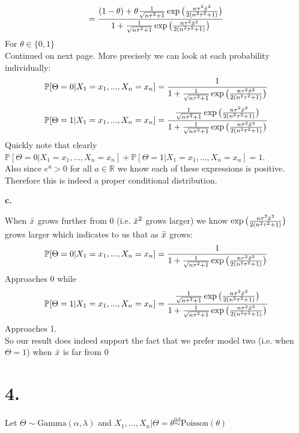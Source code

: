 \documentclass{article}
\begin{document}
\begin{center}
    \[=\frac{(1 -\theta) +\theta\frac{1}{\sqrt{n\tau^2 + 1}}\exp{\big{(}\frac{n\tau^2\Bar{x}^2}{2(n^2\tau^2 + 1)}\big{)}}}{1 +\frac{1}{\sqrt{n\tau^2 + 1}}\exp{\big{(}\frac{n\tau^2\Bar{x}^2}{2(n^2\tau^2 + 1)}\big{)}}}\]
    For $\theta\in\{0, 1\}$
    \vspace{0.2in}
    \\Continued on next page.
    \newpage
    More precisely we can look at each probability individually:
    \[\mathbb{P}[\Theta = 0 | X_1 = x_1, ..., X_n = x_n] =\frac{1}{1 +\frac{1}{\sqrt{n\tau^2 + 1}}\exp{\big{(}\frac{n\tau^2\Bar{x}^2}{2(n^2\tau^2 + 1)}\big{)}}}\]
    \[\mathbb{P}[\Theta = 1 | X_1 = x_1, ..., X_n = x_n] =\frac{\frac{1}{\sqrt{n\tau^2 + 1}}\exp{\big{(}\frac{n\tau^2\Bar{x}^2}{2(n^2\tau^2 + 1)}\big{)}}}{1 +\frac{1}{\sqrt{n\tau^2 + 1}}\exp{\big{(}\frac{n\tau^2\Bar{x}^2}{2(n^2\tau^2 + 1)}\big{)}}}\]
    Quickly note that clearly $\mathbb{P}[\Theta = 0 | X_1 = x_1, ..., X_n = x_n] +\mathbb{P}[\Theta = 1 | X_1 = x_1, ..., X_n = x_n] = 1$.
    \\Also since $e^{a} > 0$ for all $a\in\mathbb{R}$ we know each of these expressions is positive.
    \\Therefore this is indeed a proper conditional distribution.
\end{center}

{\Large\textbf{c.}}
\begin{center}
\doublespacing
    When $\Bar{x}$ grows further from 0 (i.e. $\Bar{x}^2$ grows larger) we know $\exp{\big{(}\frac{n\tau^2\Bar{x}^2}{2(n^2\tau^2 + 1)}\big{)}}$ grows larger which indicates to us that as $\Bar{x}$ grows:
    \[\mathbb{P}[\Theta = 0 | X_1 = x_1, ..., X_n = x_n] =\frac{1}{1 +\frac{1}{\sqrt{n\tau^2 + 1}}\exp{\big{(}\frac{n\tau^2\Bar{x}^2}{2(n^2\tau^2 + 1)}\big{)}}}\]
    Approaches 0 while
    \[\mathbb{P}[\Theta = 1 | X_1 = x_1, ..., X_n = x_n] =\frac{\frac{1}{\sqrt{n\tau^2 + 1}}\exp{\big{(}\frac{n\tau^2\Bar{x}^2}{2(n^2\tau^2 + 1)}\big{)}}}{1 +\frac{1}{\sqrt{n\tau^2 + 1}}\exp{\big{(}\frac{n\tau^2\Bar{x}^2}{2(n^2\tau^2 + 1)}\big{)}}}\]
    Approaches 1.
    \\So our result does indeed support the fact that we prefer model two (i.e. when $\Theta = 1$) when $\Bar{x}$ is far from 0 \qedsymbol
\end{center}


\newpage
\section*{4.}
\begin{center}
\doublespacing
    Let $\Theta\sim\mbox{Gamma}(\alpha,\lambda)$ and $X_1, ..., X_n |\Theta =\theta\overset{\mbox{iid}}{\sim}\mbox{Poisson}(\theta)$
\end{center}
\end{document}
